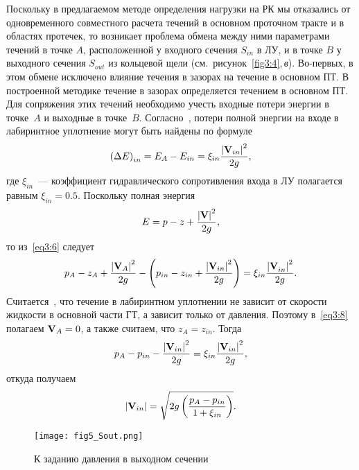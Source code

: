 Поскольку в предлагаемом методе определения нагрузки на РК мы отказались от одновременного
совместного расчета течений в основном проточном тракте и в областях протечек, то возникает проблема обмена
между ними параметрами течений в точке $A$, расположенной у входного сечения $S_{in}$ в ЛУ, и в точке
$B$ у выходного сечения $S_{out}$ из кольцевой щели (см.~рисунок~\ref{fig3:4},\,{\it в}). Во-первых, 
в этом обмене исключено влияние течения в зазорах на течение в основном ПТ. В построенной методике течение 
в зазорах определяется течением в основном ПТ. Для сопряжения этих течений необходимо учесть входные потери 
энергии в точке~$A$ и выходные в точке~$B$. Согласно~\cite{idelchik}, потери полной энергии на входе в
лабиринтное уплотнение могут быть найдены по формуле
\begin{equation}
  \left({\Delta E}\right)_{in} = E_A  - E_{in} = \xi _{in} \frac{{\left| {{\bf{V}}_{in}} \right|^2 }}{{2g}},
  \label{eq3:6}
\end{equation}
где $\xi _{in}$~--- коэффициент гидравлического сопротивления входа в ЛУ полагается равным $\xi _{in}=0.5$. 
Поскольку полная энергия
\begin{equation}
  E = p - z + \frac{{\left| {\bf{V}} \right|^2 }}{{2g}},
  \label{eq3:7}
\end{equation}
то из~\eqref{eq3:6} следует
\begin{equation}
  p_A -z_A +\frac{{\left| {{\bf{V}}_A }\right|^2 }}{{2g}} -\left({p_{in} -z_{in} +
  \frac{{\left| {{\bf{V}}_{in}}\right|^2 }}{{2g}}}\right) =
  \xi _{in} \frac{{\left| {{\bf{V}}_{in}^{} } \right|^2 }}{{2g}}.
  \label{eq3:8}
\end{equation}
Считается~\cite{mak_pilev}, что течение в лабиринтном уплотнении не зависит от скорости жидкости в
основной части ГТ, а зависит только от давления. Поэтому в~\eqref{eq3:8} полагаем
${\bf{V}}_A  = 0$, а также считаем, что $z_A=z_{in}$. Тогда
\begin{equation}
  p_A  -p_{in} -\frac{{\left| {{\bf{V}}_{in}} \right|^2 }}{{2g}}=
  \xi _{in}\frac{{\left| {{\bf{V}}_{in}}\right|^2 }}{{2g}},
  \label{eq3:9}
\end{equation}
откуда получаем
\begin{equation}
  \left| {{\bf{V}}_{in}}\right| =\sqrt{2g\left({\frac{{p_A -p_{in}}}{{1+\xi_{in}}}}\right)}.
  \label{eq3:10}
\end{equation}
\begin{figure}[ht!]
  \centering
  \texttt{[image: fig5\_Sout.png]}
  \caption{К заданию давления в выходном сечении}
  \label{fig3:5}
\end{figure}


